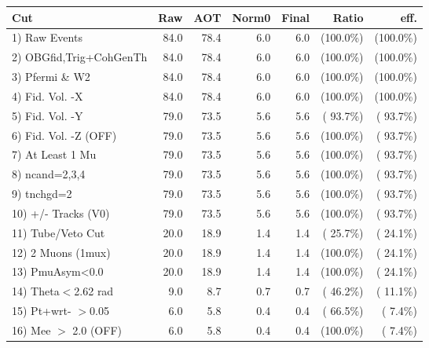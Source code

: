  \begin{table}[h!]\centering
 \begin{tabular}{||l||r|r|r|r|r|r||}
 \hline
 \hline
 Cut & Raw & AOT & Norm0 & Final & Ratio & eff.       \\
 \hline
  1) Raw Events           &         84.0 &         78.4 &          6.0 &          6.0 & (100.0\%) & (100.0\%) \\
  2) OBGfid,Trig+CohGenTh &         84.0 &         78.4 &          6.0 &          6.0 & (100.0\%) & (100.0\%) \\
  3) Pfermi \& W2         &         84.0 &         78.4 &          6.0 &          6.0 & (100.0\%) & (100.0\%) \\
  4) Fid. Vol. -X         &         84.0 &         78.4 &          6.0 &          6.0 & (100.0\%) & (100.0\%) \\
  5) Fid. Vol. -Y         &         79.0 &         73.5 &          5.6 &          5.6 & ( 93.7\%) & ( 93.7\%) \\
  6) Fid. Vol. -Z (OFF)   &         79.0 &         73.5 &          5.6 &          5.6 & (100.0\%) & ( 93.7\%) \\
  7) At Least 1 Mu        &         79.0 &         73.5 &          5.6 &          5.6 & (100.0\%) & ( 93.7\%) \\
  8) ncand=2,3,4          &         79.0 &         73.5 &          5.6 &          5.6 & (100.0\%) & ( 93.7\%) \\
  9) tnchgd=2             &         79.0 &         73.5 &          5.6 &          5.6 & (100.0\%) & ( 93.7\%) \\
 10) +/- Tracks (V0)      &         79.0 &         73.5 &          5.6 &          5.6 & (100.0\%) & ( 93.7\%) \\
 11) Tube/Veto Cut        &         20.0 &         18.9 &          1.4 &          1.4 & ( 25.7\%) & ( 24.1\%) \\
 12) 2 Muons (1mux)       &         20.0 &         18.9 &          1.4 &          1.4 & (100.0\%) & ( 24.1\%) \\
 13) PmuAsym<0.0          &         20.0 &         18.9 &          1.4 &          1.4 & (100.0\%) & ( 24.1\%) \\
 14) Theta$<$2.62 rad     &          9.0 &          8.7 &          0.7 &          0.7 & ( 46.2\%) & ( 11.1\%) \\
 15) Pt+wrt- $>$0.05      &          6.0 &          5.8 &          0.4 &          0.4 & ( 66.5\%) & (  7.4\%) \\
 16) Mee $>$ 2.0  (OFF)   &          6.0 &          5.8 &          0.4 &          0.4 & (100.0\%) & (  7.4\%) \\

\end{tabular}
\end{table}
